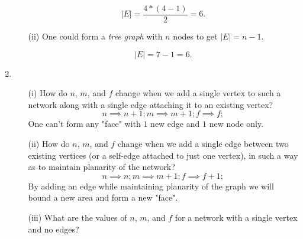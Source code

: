 \documentclass[12pt,a4paper,oneside,draft]{article}
\begin{document}
\begin{enumerate}
\begin{itemize}
\begin{center}
          $$|E| = \frac{4 * (4 - 1)}{2} = 6.$$
        \end{center}
      \item [(ii) ]
        One could form a \textit{tree graph} with $n$ nodes to get $|E| = n - 1$.
        \newline
        \begin{center}
          $$|E| = 7 - 1 = 6.$$
        \end{center}
    \end{itemize}
  \item
    \begin{itemize}
      \item [(i) ] How do $n$, $m$, and $f$ change when we add a single vertex to such a network 
      along with a single edge attaching it to an existing vertex?
      \newline
        $$n \implies n + 1; m \implies m + 1; f \implies f;$$
      One can't form any "face" with $1$ new edge and $1$ new node only.
      \newline
      \newline
      \item [(ii) ] How do $n$, $m$, and $f$ change when we add a single edge between two existing vertices
      (or a self-edge attached to just one vertex), in such a way as to maintain planarity of the network?
      \newline
        $$n \implies n; m \implies m + 1; f \implies f + 1;$$
      By adding an edge while maintaining planarity of the graph we will bound a new area and form a new "face".
      \newline
      \newline
      \item [(iii) ] What are the values of $n$, $m$, and $f$ for a network with a single vertex and no edges?

\end{itemize}
\end{enumerate}
\end{document}
